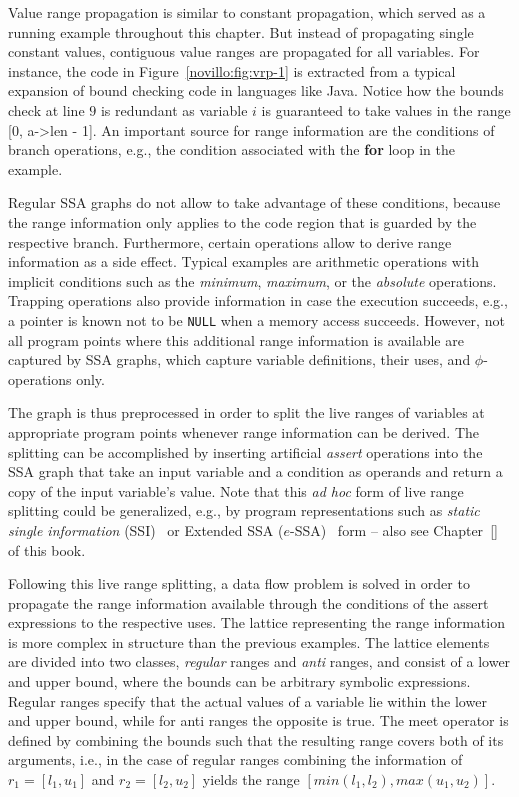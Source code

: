 Value range propagation is similar to constant propagation, which served as a
running example throughout this chapter. But instead of propagating single
constant values, contiguous value ranges are propagated for all variables. For
instance, the code in Figure~\ref{novillo:fig:vrp-1} is extracted from a
typical expansion of bound checking code in languages like Java. Notice how the
bounds check at line $9$ is redundant as variable $i$ is guaranteed to take
values in the range [$0$, a-\textgreater len - 1]. An important source for range
information are the conditions of branch operations, e.g., the condition
associated with the \textbf{for} loop in the example.

Regular SSA graphs do not allow to take advantage of these conditions, because
the range information only applies to the code region that is guarded by the
respective branch. Furthermore, certain operations allow to derive range
information as a side effect. Typical examples are arithmetic operations with
implicit conditions such as the \emph{minimum}, \emph{maximum}, or the
\emph{absolute} operations. Trapping operations also provide information in case
the execution succeeds, e.g., a pointer is known not to be \texttt{NULL} when a
memory access succeeds. However, not all program points where this additional
range information is available are captured by SSA graphs, which capture
variable definitions, their uses, and $\phi$-operations only.

The graph is thus preprocessed in order to split the live ranges of variables
at appropriate program points whenever range information can be derived. The
splitting can be accomplished by inserting artificial \emph{assert} operations
into the SSA graph that take an input variable and a condition as operands and
return a copy of the input variable's value. Note that this \emph{ad hoc} form
of live range splitting could be generalized, e.g., by program representations
such as \emph{static single information}
(SSI)~\cite{novillo:bib:A99,novillo:bib:S05} or Extended SSA
($e$-SSA)~\cite{novillo:bib:BGV00} form -- also see Chapter~\ref{} of this
book. 

Following this live range splitting, a data flow problem is solved in order to
propagate the range information available through the conditions of the assert
expressions to the respective uses. The lattice representing the range
information is more complex in structure than the previous examples. The lattice
elements are divided into two classes, \emph{regular} ranges and \emph{anti}
ranges, and consist of a lower and upper bound, where the bounds can be
arbitrary symbolic expressions. Regular ranges specify that the actual values of
a variable lie within the lower and upper bound, while for anti ranges the
opposite is true. The meet operator is defined by combining the bounds such that
the resulting range covers both of its arguments, i.e., in the case of regular
ranges combining the information of $r_1 = [l_1, u_1]$ and $r_2 = [l_2, u_2]$
yields the range $[min(l_1, l_2), max(u_1, u_2)]$.

